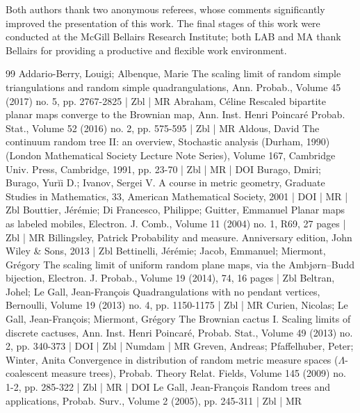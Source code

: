 \documentclass[10pt]{amsart}
\theoremstyle{definition}\newtheorem{defi}[theo]{Definition}\newtheorem{rema}[theo]{Remark}\newtheorem{exam}[theo]{Example}\newtheorem{exem}[theo]{Example}\newtheorem{nota}[theo]{Notation}
\begin{document}
Both authors thank two anonymous referees, whose comments significantly improved the presentation of this work. The final stages of this work were conducted at the McGill Bellairs Research Institute; both LAB and MA thank Bellairs for providing a productive and flexible work environment.

%




\begin{thebibliography}{99}
Addario-Berry, Louigi; Albenque, Marie The scaling limit of random simple triangulations and random simple quadrangulations, Ann. Probab., Volume 45 (2017) no. 5, pp. 2767-2825 | Zbl | MR
Abraham, Céline Rescaled bipartite planar maps converge to the Brownian map, Ann. Inst. Henri Poincaré Probab. Stat., Volume 52 (2016) no. 2, pp. 575-595 | Zbl | MR
Aldous, David The continuum random tree II: an overview, Stochastic analysis (Durham, 1990) (London Mathematical Society Lecture Note Series), Volume 167, Cambridge Univ. Press, Cambridge, 1991, pp. 23-70 | Zbl | MR | DOI
Burago, Dmiri; Burago, Yurĭi D.; Ivanov, Sergei V. A course in metric geometry, Graduate Studies in Mathematics, 33, American Mathematical Society, 2001 | DOI | MR | Zbl
Bouttier, Jérémie; Di Francesco, Philippe; Guitter, Emmanuel Planar maps as labeled mobiles, Electron. J. Comb., Volume 11 (2004) no. 1, R69, 27 pages | Zbl | MR
Billingsley, Patrick Probability and measure. Anniversary edition, John Wiley \& Sons, 2013 | Zbl
Bettinelli, Jérémie; Jacob, Emmanuel; Miermont, Grégory The scaling limit of uniform random plane maps, via the Ambjørn–Budd bijection, Electron. J. Probab., Volume 19 (2014), 74, 16 pages | Zbl
Beltran, Johel; Le Gall, Jean-François Quadrangulations with no pendant vertices, Bernoulli, Volume 19 (2013) no. 4, pp. 1150-1175 | Zbl | MR
Curien, Nicolas; Le Gall, Jean-François; Miermont, Grégory The Brownian cactus I. Scaling limits of discrete cactuses, Ann. Inst. Henri Poincaré, Probab. Stat., Volume 49 (2013) no. 2, pp. 340-373 | DOI | Zbl | Numdam | MR
Greven, Andreas; Pfaffelhuber, Peter; Winter, Anita Convergence in distribution of random metric measure spaces ($\Lambda $-coalescent measure trees), Probab. Theory Relat. Fields, Volume 145 (2009) no. 1-2, pp. 285-322 | Zbl | MR | DOI
Le Gall, Jean-François Random trees and applications, Probab. Surv., Volume 2 (2005), pp. 245-311 | Zbl | MR

\end{thebibliography}
\end{document}
